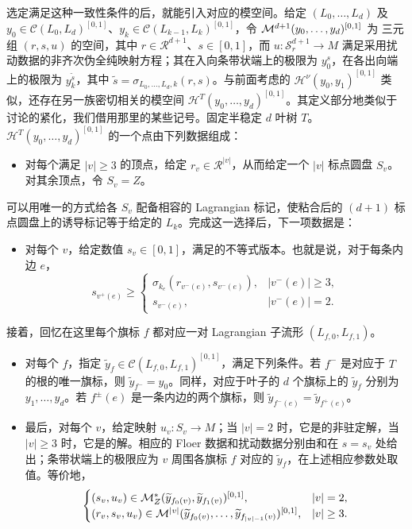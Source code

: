选定满足这种一致性条件的后，就能引入对应的模空间。给定 $(L_0,\ldots,L_d)$ 及 $y_0\in \mathcal C(L_0,L_d)^{[0,1]}$、$y_k\in \mathcal C(L_{k-1},L_k)^{[0,1]}$，令 $\mathcal M^{d+1}(y_0,\ldots,y_d)^{[0,1]}$ 为
三元组 $(r,s,u)$ 的空间，其中 $r\in\mathcal R^{d+1}$、$s\in[0,1]$，而 $u:\mathcal S_r^{d+1}\to M$ 满足采用扰动数据的非齐次伪全纯映射方程；其在入向条带状端上的极限为 $y_0^s$，在各出向端上的极限为 $y_k^{\widetilde s}$，其中 $\widetilde s=\sigma_{L_0,\ldots,L_d,k}(r,s)$。与前面考虑的 $\mathcal H^\nu(y_0,y_1)^{[0,1]}$ 类似，还存在另一族密切相关的模空间 $\mathcal H^T(y_0,\ldots,y_d)^{[0,1]}$。其定义部分地类似于讨论的紧化，我们借用那里的某些记号。固定半稳定 $d$ 叶树 $T$。$\mathcal H^T(y_0,\ldots,y_d)^{[0,1]}$ 的一个点由下列数据组成：
\begin{itemize}
\item 对每个满足 $|v|\geq3$ 的顶点，给定 $r_v\in\mathcal R^{|v|}$，从而给定一个 $|v|$ 标点圆盘 $S_v$。对其余顶点，令 $S_v=Z$。
\end{itemize}
可以用唯一的方式给各 $S_v$ 配备相容的 Lagrangian 标记，使粘合后的 $(d+1)$ 标点圆盘上的诱导标记等于给定的 $L_k$。完成这一选择后，下一项数据是：
\begin{itemize}
\item 对每个 $v$，给定数值 $s_v\in[0,1]$，满足的不等式版本。也就是说，对于每条内边 $e$，
\begin{equation}\label{eq:10.16}
s_{v^+(e)}\geq
\begin{cases}
\sigma_{k_e}(r_{v^-(e)},s_{v^-(e)}),&|v^-(e)|\geq3,\\
s_{v^-(e)},&|v^-(e)|=2.
\end{cases}
\end{equation}
\end{itemize}
接着，回忆在这里每个旗标 $f$ 都对应一对 Lagrangian 子流形 $(L_{f,0},L_{f,1})$。
\begin{itemize}
\item 对每个 $f$，指定 $\widetilde y_f\in \mathcal C(L_{f,0},L_{f,1})^{[0,1]}$，满足下列条件。若 $f^-$ 是对应于 $T$ 的根的唯一旗标，则 $\widetilde y_{f^-}=y_0$。同样，对应于叶子的 $d$ 个旗标上的 $\widetilde y_f$ 分别为 $y_1,\ldots,y_d$。若 $f^\pm(e)$ 是一条内边的两个旗标，则 $\widetilde y_{f^-(e)}=\widetilde y_{f^+(e)}$。
\item 最后，对每个 $v$，给定映射 $u_v:S_v\to M$；当 $|v|=2$ 时，它是的非驻定解，当 $|v|\geq3$ 时，它是的解。相应的 Floer 数据和扰动数据分别由和在 $s=s_v$ 处给出；条带状端上的极限应为 $v$ 周围各旗标 $f$ 对应的 $\widetilde y_f$，在上述相应参数处取值。等价地，
\[
\begin{cases}
(s_v,u_v)\in\mathcal M_Z^*(\widetilde y_{f_0(v)},\widetilde y_{f_1(v)})^{[0,1]},&|v|=2,\\
(r_v,s_v,u_v)\in\mathcal M^{|v|}(\widetilde y_{f_0(v)},\ldots,\widetilde y_{f_{|v|-1}(v)})^{[0,1]},&|v|\geq3.
\end{cases}
\]
\end{itemize}
